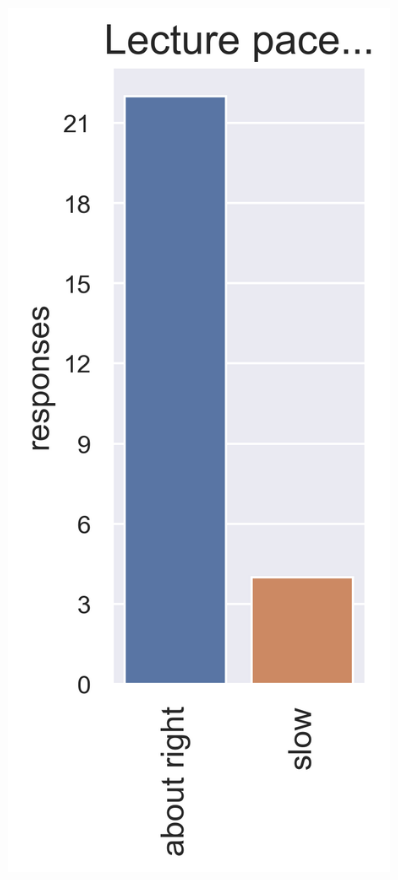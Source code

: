 \documentclass[aspectratio=169]{beamer}
\begin{document}
\begin{frame}[t]

\begin{columns}

\begin{figure}
\includegraphics[width=0.9\textwidth]{survey_pace}
\caption*{}
\end{figure}


\end{columns}
\end{frame}
\end{document}
